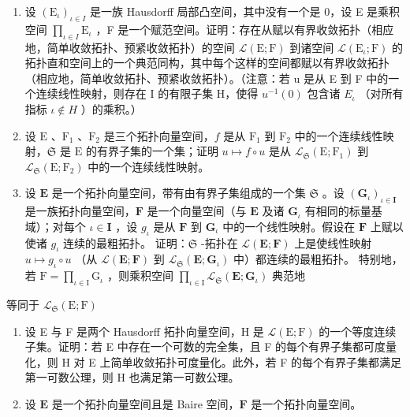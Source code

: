 \begin{enumerate}
\def\labelenumi{\arabic{enumi})}
\setcounter{enumi}{5}
\item
  设 \((\mathrm{E}_{\iota})_{\iota \in I}\) 是一族 Hausdorff 局部凸空间，其中没有一个是 0，设 E 是乘积空间 \(\prod_{\iota \in I} \mathrm{E}_{\iota}\) ，F 是一个赋范空间。证明：存在从赋以有界收敛拓扑（相应地，简单收敛拓扑、预紧收敛拓扑）的空间 \(\mathcal{L}(\mathrm{E};\mathrm{F})\) 到诸空间 \(\mathcal{L}(\mathrm{E}_{\iota};\mathrm{F})\) 的拓扑直和空间上的一个典范同构，其中每个这样的空间都赋以有界收敛拓扑（相应地，简单收敛拓扑、预紧收敛拓扑）。（注意：若 u 是从 E 到 F 中的一个连续线性映射，则存在 I 的有限子集 H，使得 \(u^{-1}(0)\) 包含诸 \(E_{\iota}\) （对所有指标 \(\iota\notin H\) ）的乘积。）
\item
  设 \(\mathrm{E}\) 、\(\mathrm{F}_1\) 、\(\mathrm{F}_2\) 是三个拓扑向量空间，\(f\) 是从 \(\mathrm{F}_1\) 到 \(\mathrm{F}_2\) 中的一个连续线性映射，\(\mathfrak{S}\) 是 \(\mathrm{E}\) 的有界子集的一个集；证明 \(u \mapsto f \circ u\) 是从 \(\mathcal{L}_{\mathfrak{S}}(\mathrm{E};\mathrm{F}_1)\) 到 \(\mathcal{L}_{\mathfrak{S}}(\mathrm{E};\mathrm{F}_2)\) 中的一个连续线性映射。
\item
  设 \(\mathbf{E}\) 是一个拓扑向量空间，带有由有界子集组成的一个集 \(\mathfrak{S}\) 。设 \((\mathbf{G}_{\iota})_{\iota \in \mathbf{I}}\) 是一族拓扑向量空间，\(\mathbf{F}\) 是一个向量空间（与 \(\mathbf{E}\) 及诸 \(\mathbf{G}_{\iota}\) 有相同的标量基域）；对每个 \(\iota \in \mathbf{I}\) ，设 \(g_{\iota}\) 是从 \(\mathbf{F}\) 到 \(\mathbf{G}_{\iota}\) 中的一个线性映射。假设在 \(\mathbf{F}\) 上赋以使诸 \(g_{\iota}\) 连续的最粗拓扑。 证明：\(\mathfrak{S}\) -拓扑在 \(\mathcal{L}(\mathbf{E};\mathbf{F})\) 上是使线性映射 \(u\mapsto g_{\iota}\circ u\) （从 \(\mathcal{L}(\mathbf{E};\mathbf{F})\) 到 \(\mathcal{L}_{\mathfrak{S}}(\mathbf{E};\mathbf{G}_{\iota})\) 中）都连续的最粗拓扑。 特别地，若 \(\mathrm{F} = \prod_{\iota \in \mathrm{I}}\mathrm{G}_{\iota}\) ，则乘积空间 \(\prod_{\iota \in \mathrm{I}}\mathcal{L}_{\mathfrak{S}}(\mathbf{E};\mathbf{G}_{\iota})\) 典范地
\end{enumerate}

等同于 \(\mathcal{L}_{\mathfrak{S}}(\mathrm{E};\mathrm{F})\)

\begin{enumerate}
\def\labelenumi{\arabic{enumi})}
\setcounter{enumi}{8}
\item
  设 E 与 F 是两个 Hausdorff 拓扑向量空间，H 是 \(\mathcal{L}(\mathrm{E};\mathrm{F})\) 的一个等度连续子集。证明：若 E 中存在一个可数的完全集，且 F 的每个有界子集都可度量化，则 H 对 E 上简单收敛拓扑可度量化。此外，若 F 的每个有界子集都满足第一可数公理，则 H 也满足第一可数公理。
\item
  设 \(\mathbf{E}\) 是一个拓扑向量空间且是 Baire 空间，\(\mathbf{F}\) 是一个拓扑向量空间。
\end{enumerate}

